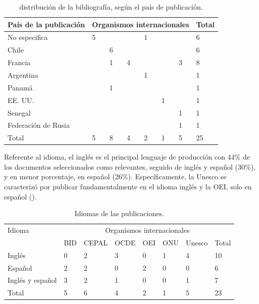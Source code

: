 \begin{table}[htpb]
\centering
\begin{threeparttable}
\caption{distribución de la bibliografía, según el país de publicación.}
\label{tab-08}
\begin{tabular}{*{8}{l}}
\toprule
  País de la publicación & \multicolumn{6}{c}{Organismos internacionales} & Total \\
\midrule
  No especifica & 5 & & & 1 & & & 6 \\
  Chile & & 6 & & & & & 6 \\
  Francia & & 1 & 4 & & & 3 & 8 \\
  Argentina & & & & 1 & & & 1 \\
  Panamá & & 1 & & & & & 1 \\
  EE. UU. & & & & & 1 & & 1 \\
  Senegal & & & & & & 1 & 1 \\
  Federación de Rusia & & & & & & 1 & 1 \\
  Total & 5 & 8 & 4 & 2 & 1 & 5 & 25 \\
 \bottomrule
\end{tabular}
\end{threeparttable}
\end{table}

Referente al idioma, el inglés es el principal lenguaje de producción
con 44\% de los documentos seleccionados como relevantes, seguido de
inglés y español (30\%), y en menor porcentaje, en español (26\%).
Específicamente, la Unesco se caracterizó por publicar fundamentalmente
en el idioma inglés y la OEI, solo en español ().


\begin{table}[htpb]
  \centering
  \begin{threeparttable}
  \caption{Idiomas de las publicaciones.}
  \label{tab-09}
  \begin{tabular}{llllllll}
  \toprule
  Idioma & \multicolumn{7}{c}{Organismos internacionales} \\
    & BID & CEPAL & OCDE & OEI & ONU & Unesco & Total \\
  \midrule
  Inglés & 0 & 2 & 3 & 0 & 1 & 4 & 10 \\
  Español & 2 & 2 & 0 & 2 & 0 & 0 & 6 \\
  Inglés y español & 3 & 2 & 1 & 0 & 0 & 1 & 7 \\
  Total & 5 & 6 & 4 & 2 & 1 & 5 & 23 \\
  \bottomrule
  \end{tabular}
  \end{threeparttable}
\end{table}

